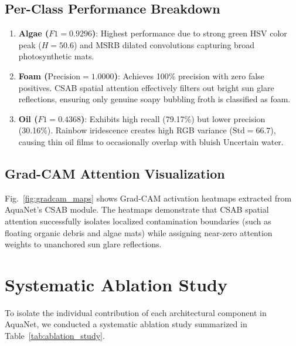 \documentclass[journal]{IEEEtran}
\newcommand{\method}{AquaNet}
\begin{document}
\subsection{Per-Class Performance Breakdown}
\begin{enumerate}
    \item \textbf{\textsf{Algae} ($F1 = 0.9296$)}: Highest performance due to strong green HSV color peak ($H=50.6$) and MSRB dilated convolutions capturing broad photosynthetic mats.
    \item \textbf{\textsf{Foam} ($\text{Precision} = 1.0000$)}: Achieves 100\% precision with zero false positives. CSAB spatial attention effectively filters out bright sun glare reflections, ensuring only genuine soapy bubbling froth is classified as foam.
    \item \textbf{\textsf{Oil} ($F1 = 0.4368$)}: Exhibits high recall (79.17\%) but lower precision (30.16\%). Rainbow iridescence creates high RGB variance ($\text{Std}=66.7$), causing thin oil films to occasionally overlap with bluish \textsf{Uncertain} water.
\end{enumerate}

\subsection{Grad-CAM Attention Visualization}
Fig.~\ref{fig:gradcam_maps} shows Grad-CAM activation heatmaps \cite{gradcam_selvaraju_2017} extracted from \method{}'s CSAB module. The heatmaps demonstrate that CSAB spatial attention successfully isolates localized contamination boundaries (such as floating organic debris and algae mats) while assigning near-zero attention weights to unanchored sun glare reflections.

\section{Systematic Ablation Study}
\label{sec:ablation}

To isolate the individual contribution of each architectural component in \method{}, we conducted a systematic ablation study summarized in Table~\ref{tab:ablation_study}.
\end{document}
